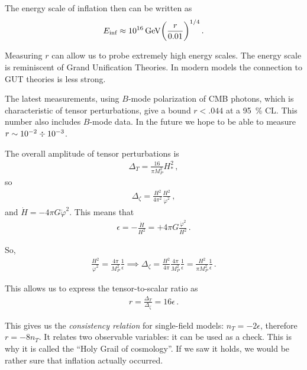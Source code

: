 \documentclass[main.tex]{subfiles}
\begin{document}
The energy scale of inflation then can be written as 
%
\begin{align}
E _{\text{inf}} \approx \SI{e16}{GeV} \qty(\frac{r}{\num{.01}})^{1/4}
\,.
\end{align}

Measuring \(r\) can allow us to probe extremely high energy scales.
The energy scale is reminiscent of Grand Unification Theories. 
In modern models the connection to GUT theories is less strong.

The latest measurements, using \(B\)-mode polarization of CMB photons, which is characteristic of tensor perturbations, give a bound \(r < \num{.044}\) at a \SI{95}{\percent} CL. This number also includes \(B\)-mode data.
In the future we hope to be able to measure \(r \sim \num{e-2} \divisionsymbol \num{e-3}\). 

The overall amplitude of tensor perturbations is 
%
\begin{align}
\Delta _T = \frac{16}{\pi M_P^2} H^2_*
\,,
\end{align}
%
so 
%
\begin{align}
\Delta_{\zeta } = \frac{H^2}{4 \pi^2} \frac{H^2}{\dot{\varphi}^2} 
\,,
\end{align}
%
and \(\dot{H} = - 4 \pi G \dot{\varphi}^2\). 
This means that 
%
\begin{align}
\epsilon  = - \frac{\dot{H}}{H^2} = + 4 \pi G \frac{\dot{\varphi}^2}{H^2}
\,.
\end{align}

So, 
%
\begin{align}
\frac{H^2}{\dot{\varphi}^2} = \frac{4 \pi }{M_P^2} \frac{1}{\epsilon } \implies 
\Delta_\zeta = \frac{H^2}{4 \pi } \frac{4 \pi }{M_P^2} \frac{1}{\epsilon } = \frac{H^2}{\pi M_P^2 } \frac{1}{\epsilon }
\,.
\end{align}

This allows us to express the tensor-to-scalar ratio as 
%
\begin{align}
r =\frac{\Delta _T}{\Delta _\zeta } = 16 \epsilon 
\,. 
\end{align}

This gives us the \emph{consistency relation} for single-field models: \(n_T = - 2 \epsilon\), therefore \(r = - 8 n_T\). 
It relates two observable variables: it can be used as a check. 
This is why it is called the ``Holy Grail of cosmology''. If we saw it holds, we would be rather sure that inflation actually occurred. 
\end{document}
